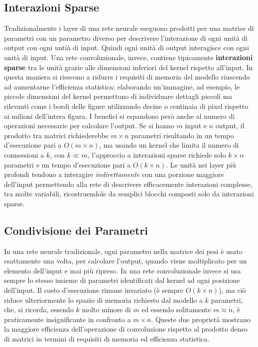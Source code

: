 \documentclass[12pt,a4paper]{report}
\begin{document}
    \subsection{Interazioni Sparse}
    Tradizionalmente i layer di una rete neurale eseguono prodotti
    per una matrice di parametri con un parametro diverso per 
    descrivere l'interazione di ogni unit\`a di output con ogni 
    unti\`a di input. Quindi ogni unit\`a di output interagisce con
    ogni unit\`a di input. Una rete convoluzionale, invece, 
    contiene tipicamente \textbf{interazioni sparse} tra le unit\`a
    grazie alle dimensioni inferiori del kernel rispetto all'input.
    In questa maniera si riescono a ridurre i requisiti di memoria
    del modello riuscendo ad aumentarne l'efficienza statistica;
    elaborando un'immagine, ad esempio, le piccole dimensioni del
    kernel permettono di individuare dettagli piccoli ma rilevanti
    come i bordi delle figure utilizzando decine o centinaia di 
    pixel rispetto ai milioni dell'intera figura. I benefici si
    espandono per\`o anche al numero di operazioni necessarie per
    calcolare l'output. Se si hanno $m$ input e $n$ output, il 
    prodotto tra matrici richiederebbe $m\times n$ parametri
    risultando in un tempo d'esecuzione pari a $O(m\times n)$, ma
    usando un kernel che limita il numero di connessioni a $k$, con
    $k\ll m$, l'approccio a interazioni sparse richiede solo 
    $k\times n$ parametri e un tempo d'esecuzione pari a 
    $O(k\times n)$. Le unit\`a nei layer pi\`u profondi tendono a 
    interagire \textit{indirettamente} con una porzione maggiore
    dell'input permettendo alla rete di descrivere efficacemente
    interazioni complesse, tra molte variabili, ricostruendole da 
    semplici blocchi composti solo da interazioni sparse.

    \subsection{Condivisione dei Parametri}
    In una rete neurale tradizionale, ogni parametro nella matrice
    dei pesi \`e usato esattamente una volta, per calcolare 
    l'output, quando viene moltiplicato per un elemento dell'input
    e mai pi\`u ripreso. In una rete convoluzionale invece si usa
    sempre lo stesso insieme di parametri identificati dal kernel
    ad ogni posizione dell'input. Il costo d'esecuzione rimane
    invariato (\`e sempre $O(k\times n)$), ma ci\`o riduce 
    ulteriormente lo spazio di memoria richiesto dal modello a $k$
    parametri, che, si ricorda, essendo $k$ molto minore di $m$ ed 
    essendo solitamente $m\approx n$, \`e praticamente 
    insignificante in confronto a $m\times n$. Queste due 
    propriet\`a mostrano la maggiore efficienza dell'operazione di
    convoluzione rispetto al prodotto denso di matrici in termini
    di requisiti di memoria ed efficienza statistica.
\end{document}
